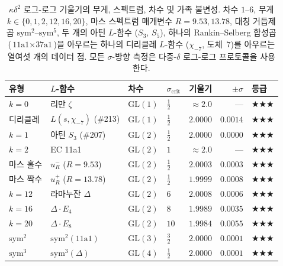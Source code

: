 \documentclass[11pt, a4paper]{article}
\theoremstyle{plain}
\theoremstyle{definition}
\begin{document}
\begin{table}[ht]
\centering
\caption{$\kappa\delta^{2}$ 로그-로그 기울기의 무게, 스펙트럼, 차수 및 가족 불변성.
  차수 $1$--$6$, 무게 $k\in\{0,1,2,12,16,20\}$, 마스 스펙트럼 매개변수
  $R=9.53,13.78$, 대칭 거듭제곱 $\mathrm{sym}^{2}$--$\mathrm{sym}^{5}$,
  두 개의 아틴 $L$-함수 ($S_3$, $S_5$), 하나의 Rankin--Selberg
  합성곱 ($\text{11a1}\times\text{37a1}$)을 아우르는
  하나의 디리클레 $L$-함수 ($\chi_{-7}$, 도체~$7$)를 아우르는
  열여섯 개의 데이터 점. 모든 $\sigma$-방향 측정은 다중-$\delta$ 로그-로그 프로토콜을 사용한다.}
\label{tab:weightuniv}
\small
\begin{tabular}{llllrrl}
\toprule
유형 & $L$-함수 & 차수 & $\sigma_{\mathrm{crit}}$ & 기울기 & $\pm\sigma$ & 등급 \\
\midrule
$k{=}0$  & 리만 $\zeta$ & $\mathrm{GL}(1)$ & $\tfrac{1}{2}$ & $\approx 2.0$ & --- & $\bigstar\bigstar\bigstar$ \\
디리클레 & $L(s,\chi_{-7})$ (\#213) & $\mathrm{GL}(1)$ & $\tfrac{1}{2}$ & $\mathbf{2.0000}$ & $\mathbf{0.0014}$ & $\bigstar\bigstar\bigstar$ \\
$k{=}1$  & 아틴 $S_3$ (\#207) & $\mathrm{GL}(2)$ & $\tfrac{1}{2}$ & $\mathbf{2.0000}$ & $\mathbf{0.0000}$ & $\bigstar\bigstar\bigstar$ \\
$k{=}2$  & EC 11a1 & $\mathrm{GL}(2)$ & $1$ & $\approx 2.0$ & --- & $\bigstar\bigstar\bigstar$ \\
마스 홀수 & $u_{R}^{-}$ ($R{=}9.53$) & $\mathrm{GL}(2)$ & $\tfrac{1}{2}$ & $\mathbf{2.0003}$ & $\mathbf{0.0003}$ & $\bigstar\bigstar\bigstar$ \\
마스 짝수 & $u_{R}^{+}$ ($R{=}13.78$) & $\mathrm{GL}(2)$ & $\tfrac{1}{2}$ & $1.9999$ & $0.0008$ & $\bigstar\bigstar\bigstar$ \\
$k{=}12$ & 라마누잔 $\Delta$ & $\mathrm{GL}(2)$ & $6$ & $2.0008$ & $0.0006$ & $\bigstar\bigstar\bigstar$ \\
$k{=}16$ & $\Delta\cdot E_4$ & $\mathrm{GL}(2)$ & $8$ & $1.9989$ & $0.0035$ & $\bigstar\bigstar\bigstar$ \\
$k{=}20$ & $\Delta\cdot E_8$ & $\mathrm{GL}(2)$ & $10$ & $1.9984$ & $0.0055$ & $\bigstar\bigstar\bigstar$ \\
$\mathrm{sym}^{2}$ & $\mathrm{sym}^{2}(\text{11a1})$ & $\mathrm{GL}(3)$ & $\tfrac{3}{2}$ & $\mathbf{2.0000}$ & $\mathbf{0.0001}$ & $\bigstar\bigstar\bigstar$ \\
$\mathrm{sym}^{3}$ & $\mathrm{sym}^{3}(\Delta)$ & $\mathrm{GL}(4)$ & $\tfrac{1}{2}$ & $\mathbf{2.0000}$ & $\mathbf{0.0001}$ & $\bigstar\bigstar\bigstar$ \\

\end{tabular}
\end{table}
\end{document}
